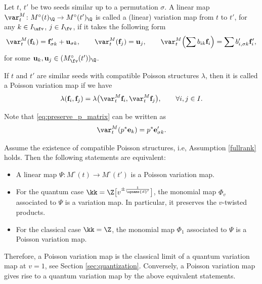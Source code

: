 \documentclass[pdftex]{sigma}
\newcommand{\Mc}{M^\circ}
\newcommand{\Iufv}{I_{\ufv}}
\newcommand{\Ifv}{I_{\fv}}
\renewcommand{\diag}{\opname{d}'}
\newcommand{\ee}{\mathbf{e}}
\newcommand{\ff}{\mathbf{f}}
\renewcommand{\uu}{\mathbf{u}}
\numberwithin{equation}{section}
\begin{document}
\begin{Definition}\label{def:variation_linear}
Let $t$, $t'$ be two seeds similar up to a permutation $\sigma$.
A linear map $\var_{t}^{M}\colon\Mc(t)_{\Q}\allowbreak\rightarrow\Mc(t')_{\Q}$ is
called a (linear) variation map from $t$ to $t'$, for any $k\in\Iufv$,
$j\in\Ifv$, if it takes the following form
\begin{gather}
\var_{t}^{M}(\ff_{k}) = \ff'_{\sigma k}+\uu_{\sigma k},\qquad
\var_{t}^{M}(\ff_{j}) = \uu_{j},\qquad
\var_{t}^{M}\Bigl(\sum b_{ik}\ff_{i}\Bigr) = \sum b'_{i,\sigma k}\ff'_{i},\label{eq:preserve_p_matrix}
\end{gather}
for some $\uu_{k},\uu_{j}\in(\Mc_{\fv}(t'))_{\Q}$.

If $t$ and $t'$ are similar seeds with compatible Poisson structures $\lambda$, then
it is called a Poisson variation map if we have
\begin{gather*}
\lambda(\ff_{i},\ff_{j}) = \lambda\bigl(\var_{t}^{M}\ff_{i},\var_{t}^{M}\ff_{j}\bigr),\qquad \forall i,j\in I.
\end{gather*}
\end{Definition}

Note that \eqref{eq:preserve_p_matrix} can be written as
\begin{equation}\label{eq:preserve_p_map}
\var_{t}^{M}(p^{*}\ee_{k}) =p^{*}\ee'_{\sigma k}.
\end{equation}

\begin{Remark}\label{rem:Poisson_quantum_variation}
Assume the existence of compatible Poisson structures, i.e, Assumption \ref{fullrank} holds. Then the following statements are equivalent:
\begin{itemize}\itemsep=0pt
 \item A linear map $\varPsi\colon\Mc(t)\rightarrow \Mc(t')$ is a Poisson variation map.
 \item For the quantum case $\kk=\Z\big[v^{\pm\frac{1}{\diag}}\big]$, the monomial map $\varPhi_v$ associated to $\varPsi$ is a variation map. In particular, it preserves the $v$-twisted products.
 \item For the classical case $\kk=\Z$, the monomial map $\varPhi_1$ associated to $\varPsi$ is a Poisson variation map.
\end{itemize}
Therefore, a Poisson variation map is the classical limit of a quantum variation map at $v=1$, see Section \ref{sec:quantization}. Conversely, a Poisson variation map gives rise to a quantum variation map by the above equivalent statements.
\end{Remark}
\end{document}
